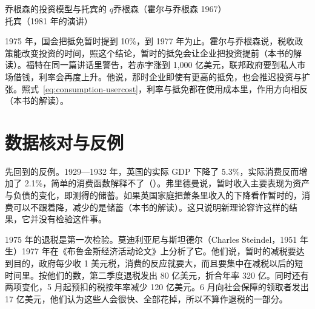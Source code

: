 \begin{compare}{乔根森的投资模型与托宾的 $q$}{乔根森（霍尔与乔根森 1967）}{托宾（1981 年的演讲）}
\end{compare}

1975 年，国会把抵免暂时提到 10\%，到 1977 年为止\cite{pl9412}。霍尔与乔根森说，税收政策能改变投资的时间，照这个结论，暂时的抵免会让企业把投资提前（本书的解读）\cite{hj1967}。福特在同一篇讲话里警告，若赤字涨到 1,000 亿美元，联邦政府要到私人市场借钱，利率会再度上升\cite{ford1975}。他说，那时企业即使有更高的抵免，也会推迟投资与扩张\cite{ford1975}。照式~\eqref{eq:consumption-usercost}，利率与抵免都在使用成本里，作用方向相反（本书的解读）。

\section{数据核对与反例}\label{sec:consumption-check}

先回到的反例。1929—1932 年，英国的实际 GDP 下降了 5.3\%，实际消费反而增加了 2.1\%，简单的消费函数解释不了（）。弗里德曼说，暂时收入主要表现为资产与负债的变化，即测得的储蓄\cite{friedman1957}。如果英国家庭把萧条里收入的下降看作暂时的，消费可以不跟着降，减少的是储蓄（本书的解读）。这只说明新理论容许这样的结果，它并没有检验这件事。

1975 年的退税是第一次检验。莫迪利亚尼与斯坦德尔（Charles Steindel，1951 年生）1977 年在《布鲁金斯经济活动论文》上分析了它\cite{ms1977,loc39}。他们说，暂时的减税要达到目的，政府每少收 1 美元税，消费的反应就要大，而且要集中在减税以后的短时间里\cite{ms1977}。按他们的数，第二季度退税发出 80 亿美元，折合年率 320 亿\cite{ms1977}。同时还有两项变化，5 月起预扣的税按年率减少 120 亿美元\cite{ms1977}。6 月向社会保障的领取者发出 17 亿美元，他们认为这些人会很快、全部花掉，所以不算作退税的一部分\cite{ms1977}。

